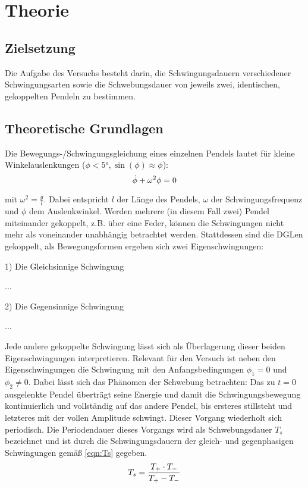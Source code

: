 \section{Theorie}
\label{sec:Theorie}

\subsection{Zielsetzung}
Die Aufgabe des Versuchs besteht darin, die Schwingungsdauern verschiedener
Schwingungsarten sowie die Schwebungsdauer von jeweils zwei, identischen,
gekoppelten Pendeln zu bestimmen.
\subsection{Theoretische Grundlagen}
Die Bewegungs-/Schwingungsgleichung eines einzelnen Pendels lautet für kleine
Winkelauslenkungen ($\phi < \ang{5}, \sin(\phi) \approx \phi$):
\begin{equation}
  \centering
  \dot{\phi}+ \omega^2 \phi = 0
  \label{eqn:schwgl}
\end{equation}

mit $\omega ^2 = \frac{g}{l}.$
Dabei entspricht $l$ der Länge des Pendels, $\omega$ der Schwingungsfrequenz und
$\phi$ dem Auslenkwinkel.
Werden mehrere (in diesem Fall zwei) Pendel miteinander gekoppelt, z.B. über
eine Feder, können die Schwingungen nicht mehr als voneinander unabhängig
betrachtet werden. Stattdessen sind die DGLen gekoppelt, als
Bewegungsformen ergeben sich zwei Eigenschwingungen:

1) Die Gleichsinnige Schwingung

...

2) Die Gegensinnige Schwingung

...

Jede andere gekoppelte Schwingung lässt sich als Überlagerung dieser beiden
Eigenschwingungen interpretieren. Relevant für den Versuch ist neben den
Eigenschwingungen die Schwingung mit den Anfangsbedingungen
$\phi_1 = 0$ und $\phi_2 \neq 0$.
Dabei lässt sich das Phänomen der Schwebung betrachten: Das zu $t = 0$
ausgelenkte Pendel überträgt seine Energie und damit die Schwingungsbewegung
kontinuierlich und vollständig
auf das andere Pendel, bis ersteres stillsteht und letzteres
mit der vollen Amplitude schwingt. Dieser Vorgang wiederholt sich periodisch.
Die Periodendauer dieses Vorgangs wird als Schwebungsdauer $T_s$ bezeichnet und
ist durch die Schwingungsdauern der gleich- und gegenphasigen Schwingungen
gemäß \ref{eqn:Ts} gegeben.
\begin{equation}
  \centering
  T_s  = \frac{T_+ \cdot T_-}{T_+ - T_-}
  \label{eqn:Ts}
\end{equation}
